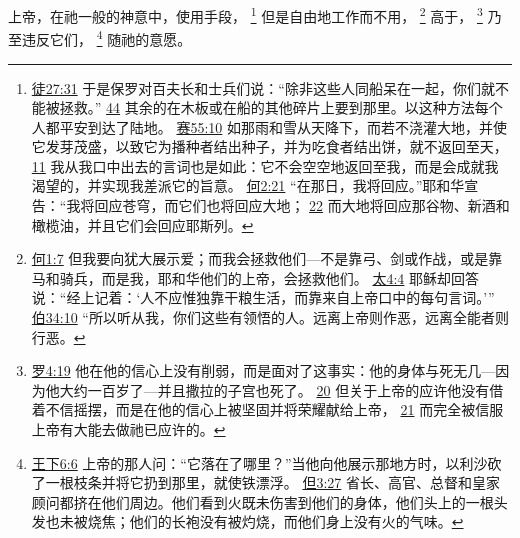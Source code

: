 \documentclass[12pt, a4paper, oneside]{ctexart}
\newcounter{parnum}[section]
\newcommand{\N}{%
   \noindent\refstepcounter{parnum}%
    \makebox[\parindent][l]{\textbf{\arabic{parnum}.}}}
\begin{document}
\N 上帝，在祂一般的神意中，使用手段，
	\footnote {
		\href{https://biblehub.com/acts/27-31.htm}{徒27:31} 于是保罗对百夫长和士兵们说：“除非这些人同船呆在一起，你们就不能被拯救。”
		\href{https://biblehub.com/acts/27-44.htm}{44} 其余的在木板或在船的其他碎片上要到那里。以这种方法每个人都平安到达了陆地。
		\href{https://biblehub.com/isaiah/55-10.htm}{赛55:10} 如那雨和雪从天降下，而若不浇灌大地，并使它发芽茂盛，以致它为播种者结出种子，并为吃食者结出饼，就不返回至天，
		\href{https://biblehub.com/isaiah/55-11.htm}{11} 我从我口中出去的言词也是如此：它不会空空地返回至我，而是会成就我渴望的，并实现我差派它的旨意。
		\href{https://biblehub.com/hosea/2-21.htm}{何2:21} “在那日，我将回应。”耶和华宣告：“我将回应苍穹，而它们也将回应大地；
		\href{https://biblehub.com/hosea/2-22.htm}{22} 而大地将回应那谷物、新酒和橄榄油，并且它们会回应耶斯列。
	}
	但是自由地工作而不用，
	\footnote {
		\href{https://biblehub.com/hosea/1-7.htm}{何1:7} 但我要向犹大展示爱；而我会拯救他们---不是靠弓、剑或作战，或是靠马和骑兵，而是我，耶和华他们的上帝，会拯救他们。
		\href{https://biblehub.com/matthew/4-4.htm}{太4:4} 耶稣却回答说：“经上记着：‘人不应惟独靠干粮生活，而靠来自上帝口中的每句言词。’” 
		\href{https://biblehub.com/job/34-10.htm}{伯34:10} “所以听从我，你们这些有领悟的人。远离上帝则作恶，远离全能者则行恶。	
	}
	高于，
	\footnote {
		\href{https://biblehub.com/romans/4-19.htm}{罗4:19} 他在他的信心上没有削弱，而是面对了这事实：他的身体与死无几---因为他大约一百岁了---并且撒拉的子宫也死了。
		\href{https://biblehub.com/romans/4-20.htm}{20} 但关于上帝的应许他没有借着不信摇摆，而是在他的信心上被坚固并将荣耀献给上帝，
		\href{https://biblehub.com/romans/4-21.htm}{21} 而完全被信服上帝有大能去做祂已应许的。
	}
	乃至违反它们，
	\footnote {
		\href{https://biblehub.com/2_kings/6-6.htm}{王下6:6} 上帝的那人问：“它落在了哪里？”当他向他展示那地方时，以利沙砍了一根枝条并将它扔到那里，就使铁漂浮。
		\href{https://biblehub.com/daniel/3-27.htm}{但3:27} 省长、高官、总督和皇家顾问都挤在他们周边。他们看到火既未伤害到他们的身体，他们头上的一根头发也未被烧焦；他们的长袍没有被灼烧，而他们身上没有火的气味。
	}
	随祂的意愿。
\end{document}
